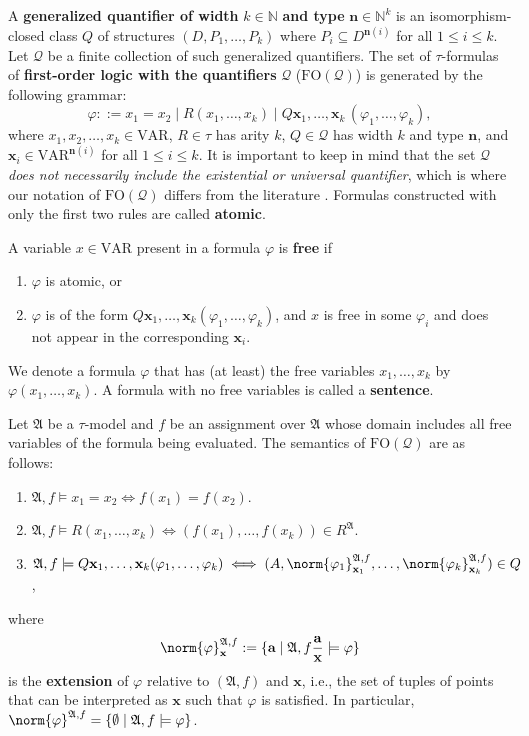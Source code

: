 \documentclass{article}
\theoremstyle{definition}
\begin{document}
A \textbf{generalized quantifier of width} $k\in\mathbb{N}$ \textbf{and type} $\mathbf{n}\in \mathbb N^k$ is an isomorphism-closed class $Q$ of structures $(D, P_1, \ldots , P_k)$ where $P_i\subseteq D^{\textbf{n}(i)}$ for all $1\leq i\leq k$. Let $\mathcal{Q}$ be a finite collection of such generalized quantifiers. The set of $\tau$-formulas of \textbf{first-order logic with the quantifiers} $\mathcal{Q}$ ($\mathrm{FO}(\mathcal{Q})$) is generated by the following grammar:
\[
    \varphi::=x_1=x_2\mid R(x_1,\dots,x_k)\mid Q\textbf{x}_1,\dots,\textbf{x}_k\, (\varphi_1,\dots,\varphi_k),
\]
where $x_1,x_2,\dots,x_k\in \mathrm{VAR}$, $R\in \tau$ has arity $k$, $Q\in\mathcal{Q}$ has width $k$ and type $\textbf{n}$, and $\textbf{x}_i\in \mathrm{VAR}^{\textbf{n}(i)}$ for all $1\leq i\leq k$. It is important to keep in mind that the set $\mathcal{Q}$ \textit{does not necessarily include the existential or universal quantifier}, which is where our notation of $\mathrm{FO}(\mathcal{Q})$ differs from the literature \cite{lindstrom1966first, ebbinghaus2005finite}. Formulas constructed with only the first two rules are called \textbf{atomic}. %

A variable $x\in\text{VAR}$ present in a formula $\varphi$ is \textbf{free} if 
\begin{enumerate}
    \item $\varphi$ is atomic, or
    \item $\varphi$ is of the form $Q\textbf{x}_1,\dots,\textbf{x}_k(\varphi_1,\dots,\varphi_k)$, and $x$ is free in some $\varphi_i$ and does not appear in the corresponding $\textbf{x}_i$.
\end{enumerate}
We denote a formula $\varphi$ that has (at least) the free variables $x_1,\dots,x_k$ by $\varphi(x_1,\dots,x_k)$. A formula with no free variables is called a \textbf{sentence}.

Let $\mathfrak{A}$ be a $\tau$-model and $f$ be an assignment over $\mathfrak{A}$ whose domain includes all free variables of the formula being evaluated. The semantics of $\mathrm{FO}(\mathcal{Q})$ are as follows:
\begin{enumerate}
    \item $\mathfrak{A},f\models x_1=x_2\iff f(x_1)=f(x_2)$.
    \item $\mathfrak{A},f\models R(x_1,\dots,x_k) \iff (f(x_1),\dots,f(x_k))\in R^{\mathfrak{A}}$.
    \item $\mathfrak{A},f\models Q \textbf{x}_1,\dots, \textbf{x}_k (\varphi_1,\dots, \varphi_k) \iff (A, \norm{\varphi_1}^{\mathfrak{A},f}_{\textbf{x}_1}, \dots, \norm{\varphi_k}^{\mathfrak{A},f}_{\textbf{x}_k})\in Q$,
\end{enumerate}
where
\[
    \norm{\varphi}^{\mathfrak{A},f}_\textbf{x}:=\{\textbf{a}\mid \mathfrak{A},f\frac{\mathbf{a}}{\textbf{x}}\models \varphi\}
\]
is the \textbf{extension} of $\varphi$ relative to $(\mathfrak{A},f)$ and $\textbf{x}$, i.e., the set of tuples of points that can be interpreted as $\textbf{x}$ such that $\varphi$ is satisfied. In particular, $\norm{\varphi}^{\mathfrak{A},f}=\{\emptyset \mid \mathfrak{A},f\models\varphi\}$.
\end{document}
